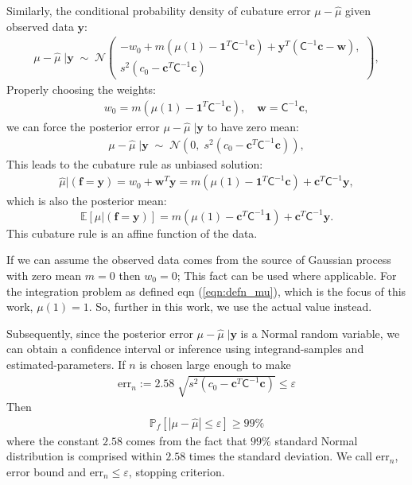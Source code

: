 \documentclass[smallextended]{svjour3}       %
\newcommand{\bm}[1]{\boldsymbol{#1}}
\newcommand{\Ex}{\mathbb{E}}
\newcommand{\vc}{\bm{c}}
\newcommand{\vf}{\bm{f}}
\newcommand{\vw}{\bm{w}}
\newcommand{\vy}{\bm{y}}
\newcommand{\vone}{\bm{1}}
\newcommand{\mC}{\mathsf{C}}
\newcommand{\calN}{\mathcal{N}}
\newcommand{\hmu}{\hat{\mu}}
\newcommand{\errtol}{\varepsilon}
\newcommand{\errn}{\text{err}_{n}}
\newenvironment{nalign}{
    \begin{equation}
    \begin{aligned}
}{
    \end{aligned}
    \end{equation}
    \ignorespacesafterend
}
\begin{document}
Similarly, the conditional probability density of cubature error $\mu-\hmu$ given observed data $\vy$:
\begin{nalign}
\mu-\hmu\;|\vy
\; \sim \; \calN 
\left(
\begin{array}{cc}
-w_0 + m (\mu(1) - \vone^T  \mC^{-1}\vc )
+
\vy^T( \mC^{-1}\vc - \vw ),
\\
s^2 (c_0 - \vc^T\mC^{-1}\vc) 
\end{array}
\right),
\end{nalign}
Properly choosing the weights:
\begin{align*}
w_0 =  m (\mu(1) - \vone^T  \mC^{-1}\vc ),
\quad
\vw = \mC^{-1}\vc,
\end{align*}
we can force the posterior error $\mu-\hmu\;|\vy$ to have zero mean:
\begin{align*}
\mu-\hmu\;|\vy
\; \sim \; \calN 
\left(
0, \;
s^2 (c_0 - \vc^T\mC^{-1}\vc) 
\right)
,
\end{align*}
This leads to the cubature rule as unbiased solution:
\begin{align}
\label{eqn:BayesCub}
\widehat{\mu}  \vert ( \vf = \vy)
= w_0 + \vw^T \vy = 
m(\mu(1) - \vone^T  \mC^{-1}\vc )
+
\vc^T \mC^{-1} \vy,
\end{align}
which is also the posterior mean: 
\begin{equation} \label{eqn:BayesCub}
\Ex [\mu \vert ( \vf = \vy)] = m(\mu(1) -  \vc^T \mC^{-1}\vone) + \vc^T \mC^{-1}  \vy.
\end{equation}
This cubature rule is an affine function of the data.

If we can assume the observed data comes from the source of Gaussian process with zero mean $m=0$ then $w_0 = 0$; This fact can be used where applicable. For the integration problem as defined eqn (\ref{eqn:defn_mu}), which is the focus of this work, $\mu(1) = 1$. So, further in this work, we use the actual value instead.

Subsequently, since the posterior error $\mu-\hmu\;|\vy$ is a Normal random variable, we can obtain a confidence interval or inference using integrand-samples and estimated-parameters. If $n$ is chosen large enough to make
\begin{align}
\errn := 2.58 \; \sqrt{ s^2 (c_0 - \vc^T\mC^{-1}\vc) } \leq \errtol
\end{align}
Then
\begin{align}
\label{eqn_prob_confidence_interval}
\mathbb{P}_f \left[
|\mu-\hmu| \leq \errtol
\right] \geq 99\%
\end{align}
where the constant $2.58$ comes from the fact that $99\%$ standard Normal distribution is comprised within $2.58$ times the standard deviation. We call $\errn$, error bound and $\errn \leq \errtol$, stopping criterion.
\end{document}
